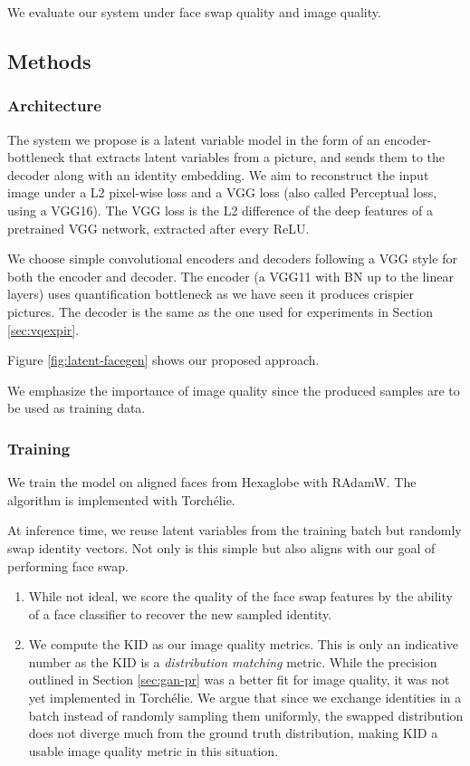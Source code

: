 We evaluate our system under face swap quality and image quality.

\subsection{Methods}

\subsubsection{Architecture}

The system we propose is a latent variable model in the form of an encoder-bottleneck that extracts latent variables from a picture, and sends them to the decoder along with an identity embedding. We aim to reconstruct the input image under a L2 pixel-wise loss and a VGG loss (also called Perceptual loss, using a VGG16). The VGG loss is the L2 difference of the deep features of a pretrained VGG network, extracted after every ReLU.

We choose simple convolutional encoders and decoders following a VGG style for both the encoder and decoder. The encoder (a VGG11 with BN up to the linear layers) uses quantification bottleneck as we have seen it produces crispier pictures. The decoder is the same as the one used for experiments in Section \ref{sec:vqexpir}.

Figure \ref{fig:latent-facegen} shows our proposed approach.

We emphasize the importance of image quality since the produced samples are to be used as training data.

\subsubsection{Training}

We train the model on aligned faces from Hexaglobe with RAdamW. The algorithm is implemented with Torchélie.

At inference time, we reuse latent variables from the training batch but randomly swap identity vectors. Not only is this simple but also aligns with our goal of performing face swap.

\begin{enumerate}
    \item While not ideal, we score the quality of the face swap features by the ability of a face classifier to recover the new sampled identity.
    \item We compute the \ac{KID} \citep{kid} as our image quality metrics. This is only an indicative number as the \ac{KID} is a \emph{distribution matching} metric. While the precision outlined in Section \ref{sec:gan-pr} was a better fit for image quality, it was not yet implemented in Torchélie. We argue that since we exchange identities in a batch instead of randomly sampling them uniformly, the swapped distribution does not diverge much from the ground truth distribution, making \ac{KID} a usable image quality metric in this situation.
\end{enumerate}


